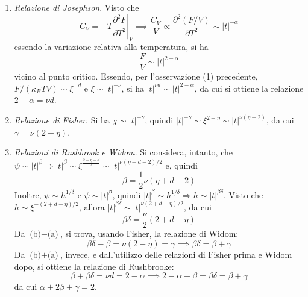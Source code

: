 \documentclass[11pt, a4paper]{scrartcl}
\theoremstyle{style}
\theoremstyle{style1}
\newcommand*\Eval[3]{\left.#1\right\rvert_{#2}^{#3}}
\numberwithin{equation}{subsection}
\begin{document}
\begin{enumerate}[(1).]
	\item \textit{Relazione di Josephson}.
		Visto che
		\[
			C_V = - T \Eval{\frac{\partial ^2 F}{\partial T^2} }{V}{} \implies \frac{C_V}{V} \propto \frac{\partial ^2 (F / V)}{\partial T^2} \sim \lvert t \rvert ^{-\alpha }
		\] 
		essendo la variazione relativa alla temperatura, si ha
		\[
		\frac{F}{V} \sim \lvert t \rvert ^{2 - \alpha } 
		\] 
		vicino al punto critico.
		Essendo, per l'osservazione (1)	precedente, $F / (\kappa _B T V) \sim\xi ^{-d}$ e $\xi \sim \lvert t \rvert ^{-\nu }$, si ha $\lvert t \rvert ^{\nu d} \sim \lvert t \rvert ^{2 - \alpha }$, da cui si ottiene la relazione $2 - \alpha = \nu  d$.
	\item \textit{Relazione di Fisher}. 
		Si ha $\chi \sim \lvert t \rvert ^{-\gamma}$, quindi $\lvert t \rvert ^{-\gamma}\sim\xi ^{2-\eta}\sim\lvert t \rvert ^{\nu (\eta-2)}$, da cui $\gamma = \nu (2-\eta)$.
	\item \textit{Relazioni di Rushbrook e Widom}. Si considera, intanto, che $\psi \sim\lvert t \rvert ^{\beta }\Rightarrow \lvert t \rvert ^{\beta }\sim\xi ^{\frac{2-\eta-d}{2}}\sim \lvert t \rvert ^{\nu (\eta+d-2) / 2}$ e, quindi
		\[
		\beta = \frac{1}{2}\nu (\eta+d-2)
		\tag{a}
		\] 
	Inoltre, $\psi \sim h ^{1 / \delta }$ e $\psi \sim \lvert t \rvert ^{\beta }$, quindi $\lvert t \rvert ^\beta \sim h^{1 / \delta } \Rightarrow  h \sim\lvert t \rvert ^{\beta  \delta }$.
	Visto che $h \sim\xi ^{-(2+d-\eta) / 2}$, allora $\lvert t \rvert ^{\beta \delta }\sim \lvert t \rvert ^{\nu (2+d-\eta)/2}$, da cui
	\[
	\beta  \delta  = \frac{\nu}{2} (2+d-\eta)
	\tag{b}
	\] 
	Da $\text{(b)}-\text{(a)}$, si trova, usando Fisher, la relazione di Widom:
	\[
		\beta \delta - \beta  = \nu (2 - \eta) = \gamma \implies \beta \delta = \beta  + \gamma
	\] 
	Da $\text{(b)}+\text{(a)}$, invece, e dall'utilizzo delle relazioni di Fisher prima e Widom dopo, si ottiene la relazione di Rushbrooke:
	\[
	\beta  + \beta \delta = \nu  d = 2 - \alpha \implies 2 - \alpha  - \beta  = \beta  \delta  = \beta  + \gamma
	\] 
	da cui $\alpha  + 2\beta  + \gamma = 2$.
\end{enumerate}
\end{document}
